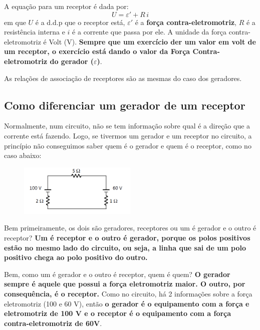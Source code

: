 \documentclass[12pt]{extarticle}
\newcommand{\<}{\langle}
\renewcommand{\>}{\rangle}
\theoremstyle{definition}
\begin{document}
A equação para um receptor é dada por:
\begin{equation}
    U = \varepsilon' + R\,i
\end{equation}
\noindent em que $U$ é a d.d.p que o receptor está, $\varepsilon'$ é a \textbf{força contra-eletromotriz}, $R$ é a resistência interna e $i$ é a corrente que passa por ele. A unidade da força contra-eletromotriz é Volt (V). \textbf{Sempre que um exercício der um valor em volt de um receptor, o exercício está dando o valor da Força Contra-eletromotriz do gerador ($\varepsilon$)}.

As relações de associação de receptores são as mesmas do caso dos geradores.
\subsection{Como diferenciar um gerador de um receptor}

Normalmente, num circuito, não se tem informação sobre qual é a direção que a corrente está fazendo. Logo, se tivermos um gerador e um receptor no circuito, a princípio não conseguimos saber quem é o gerador e quem é o receptor, como no caso abaixo:
\begin{figure}[H]
    \centering
    \includegraphics[width=0.5\textwidth]{ex_1.png}
    \label{fig:ex_1}
\end{figure}

Bem primeiramente, os dois são geradores, receptores ou um é gerador e o outro é receptor? \textbf{Um é receptor e o outro é gerador, porque os polos positivos estão no mesmo lado do circuito, ou seja, a linha que sai de um polo positivo chega ao polo positivo do outro.}

Bem, como um é gerador e o outro é receptor, quem é quem? \textbf{O gerador sempre é aquele que possui a força eletromotriz maior. O outro, por consequência, é o receptor.} Como no circuito, há 2 informações sobre a força eletromotriz (100 e 60 V), então \textbf{o gerador é o equipamento com a força e eletromotriz de 100 V e o receptor é o equipamento com a força contra-eletromotriz de 60V}.
\end{document}
